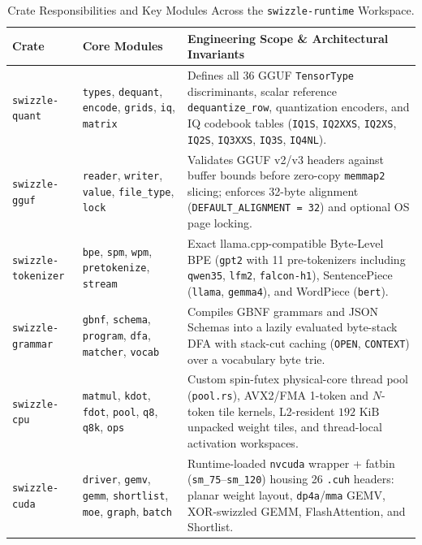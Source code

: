 \documentclass[10pt,a4paper]{article}
\theoremstyle{swzstyle}
\newcommand{\code}[1]{\texttt{#1}}
\begin{document}
\begin{table}[htbp]
  \centering
  \caption{Crate Responsibilities and Key Modules Across the \texttt{swizzle-runtime} Workspace.}
  \label{tab:crate_breakdown}
  \small
  \begin{tabularx}{\textwidth}{@{}llX@{}}
    \toprule
    \sffamily\bfseries Crate & \sffamily\bfseries Core Modules & \sffamily\bfseries Engineering Scope \& Architectural Invariants \\
    \midrule
    \code{swizzle-quant} & \code{types}, \code{dequant}, \code{encode}, \code{grids}, \code{iq}, \code{matrix} & Defines all 36 GGUF \code{TensorType} discriminants, scalar reference \code{dequantize\_row}, quantization encoders, and IQ codebook tables (\code{IQ1S}, \code{IQ2XXS}, \code{IQ2XS}, \code{IQ2S}, \code{IQ3XXS}, \code{IQ3S}, \code{IQ4NL}). \\
    \code{swizzle-gguf} & \code{reader}, \code{writer}, \code{value}, \code{file\_type}, \code{lock} & Validates GGUF v2/v3 headers against buffer bounds before zero-copy \code{memmap2} slicing; enforces 32-byte alignment (\code{DEFAULT\_ALIGNMENT = 32}) and optional OS page locking. \\
    \code{swizzle-tokenizer} & \code{bpe}, \code{spm}, \code{wpm}, \code{pretokenize}, \code{stream} & Exact llama.cpp-compatible Byte-Level BPE (\code{gpt2} with 11 pre-tokenizers including \code{qwen35}, \code{lfm2}, \code{falcon-h1}), SentencePiece (\code{llama}, \code{gemma4}), and WordPiece (\code{bert}). \\
    \code{swizzle-grammar} & \code{gbnf}, \code{schema}, \code{program}, \code{dfa}, \code{matcher}, \code{vocab} & Compiles GBNF grammars and JSON Schemas into a lazily evaluated byte-stack DFA with stack-cut caching (\code{OPEN}, \code{CONTEXT}) over a vocabulary byte trie. \\
    \code{swizzle-cpu} & \code{matmul}, \code{kdot}, \code{fdot}, \code{pool}, \code{q8}, \code{q8k}, \code{ops} & Custom spin-futex physical-core thread pool (\code{pool.rs}), AVX2/FMA 1-token and $N$-token tile kernels, L2-resident $192\text{ KiB}$ unpacked weight tiles, and thread-local activation workspaces. \\
    \code{swizzle-cuda} & \code{driver}, \code{gemv}, \code{gemm}, \code{shortlist}, \code{moe}, \code{graph}, \code{batch} & Runtime-loaded \code{nvcuda} wrapper + fatbin (\code{sm\_75}--\code{sm\_120}) housing 26 \code{.cuh} headers: planar weight layout, \code{dp4a}/\code{mma} GEMV, XOR-swizzled GEMM, FlashAttention, and Shortlist. \\

\end{tabularx}
\end{table}
\end{document}
